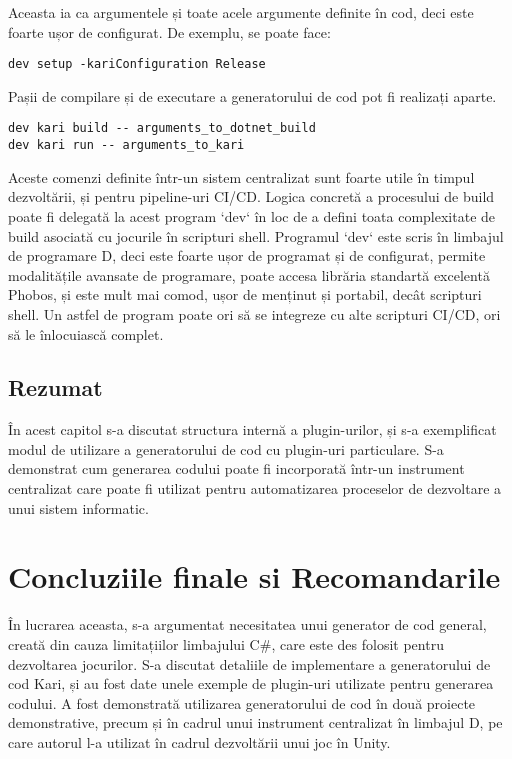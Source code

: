 \documentclass{report}
\begin{document}
Aceasta ia ca argumentele și toate acele argumente definite în cod, deci este foarte ușor de configurat.
De exemplu, se poate face:

\begin{verbatim}
dev setup -kariConfiguration Release
\end{verbatim}

Pașii de compilare și de executare a generatorului de cod pot fi realizați aparte.

\begin{verbatim}
dev kari build -- arguments_to_dotnet_build
dev kari run -- arguments_to_kari
\end{verbatim}

Aceste comenzi definite într-un sistem centralizat sunt foarte utile în timpul dezvoltării, și pentru pipeline-uri CI/CD.
Logica concretă a procesului de build poate fi delegată la acest program `dev` în loc de a defini toata complexitate de build asociată cu jocurile în scripturi shell.
Programul `dev` este scris în limbajul de programare D, deci este foarte ușor de programat și de configurat, permite modalitățile avansate de programare, poate accesa librăria standartă excelentă Phobos, și este mult mai comod, ușor de menținut și portabil, decât scripturi shell.
Un astfel de program poate ori să se integreze cu alte scripturi CI/CD, ori să le înlocuiască complet.

\section{Rezumat}

În acest capitol s-a discutat structura internă a plugin-urilor, și s-a exemplificat modul de utilizare a generatorului de cod cu plugin-uri particulare.
S-a demonstrat cum generarea codului poate fi incorporată într-un instrument centralizat care poate fi utilizat pentru automatizarea proceselor de dezvoltare a unui sistem informatic.

\chapter{Concluziile finale si Recomandarile}

În lucrarea aceasta, s-a argumentat necesitatea unui generator de cod general, creată din cauza limitațiilor limbajului C#, care este des folosit pentru dezvoltarea jocurilor.
S-a discutat detaliile de implementare a generatorului de cod Kari, și au fost date unele exemple de plugin-uri utilizate pentru generarea codului.
A fost demonstrată utilizarea generatorului de cod în două proiecte demonstrative, precum și în cadrul unui instrument centralizat în limbajul D, pe care autorul l-a utilizat în cadrul dezvoltării unui joc în Unity. 
\end{document}
